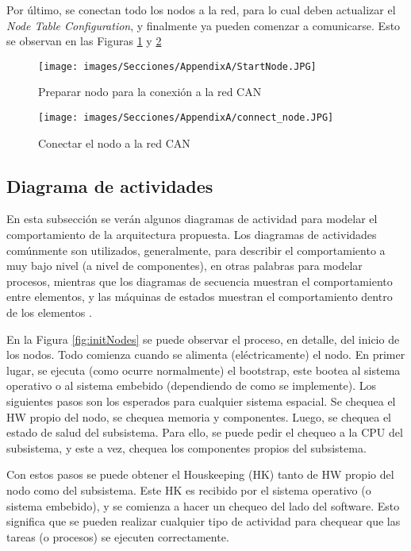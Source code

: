 Por último, se conectan todo los nodos a la red, para lo cual deben
actualizar el \textit{Node Table Configuration}, y finalmente ya
pueden comenzar a comunicarse. Esto se observan en las Figuras
\ref{fig:StartNodeC52} y \ref{fig:ConnectNodeC5}

\begin{figure}[h!]
 \centering
 \texttt{[image: images/Secciones/AppendixA/StartNode.JPG]}
  \caption{Preparar nodo para la conexión a la red CAN}
  \label{fig:StartNodeC52}
\end{figure}

\begin{figure}[h!]
 \centering
 \texttt{[image: images/Secciones/AppendixA/connect\_node.JPG]}
  \caption{Conectar el nodo a la red CAN}
  \label{fig:ConnectNodeC5}
\end{figure}

\subsection{Diagrama de actividades}
En esta subsección se verán algunos diagramas de actividad para modelar
el comportamiento de la arquitectura propuesta. Los diagramas de actividades
comúnmente son utilizados, generalmente, para describir el comportamiento
a muy bajo nivel (a nivel de componentes), en otras palabras para modelar
procesos, mientras que los diagramas de secuencia muestran el comportamiento
entre elementos, y las máquinas de estados  muestran el comportamiento
dentro de los elementos \citep{HoltPery}.

En la Figura \ref{fig:initNodes} se puede observar el proceso, en detalle,
del inicio de los nodos. Todo comienza cuando se alimenta (eléctricamente)
el nodo. En primer lugar, se ejecuta (como ocurre normalmente) el bootstrap,
este bootea al sistema operativo o al sistema embebido (dependiendo de como
se implemente). Los siguientes pasos son los esperados para cualquier sistema
espacial. Se chequea el \ac{HW} propio del nodo, se chequea memoria y componentes.
Luego, se chequea el estado de salud del subsistema. Para ello, se puede pedir
el chequeo a la CPU del subsistema, y este a vez, chequea los componentes
propios del subsistema.

Con estos pasos se puede obtener el Houskeeping (HK) tanto de \ac{HW} propio del nodo
como del subsistema. Este HK es recibido por el sistema operativo
(o sistema embebido), y se comienza a hacer un chequeo del lado del
software. Esto significa que se pueden realizar cualquier tipo de actividad
para chequear que las tareas (o procesos) se ejecuten correctamente.

